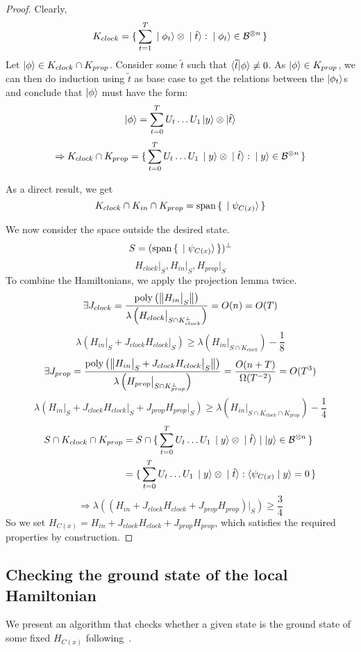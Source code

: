 \begin{proof}
	Clearly,
	$$K_{clock}=\set{\sum_{t=1}^T \ket{\phi_t}\otimes\ket{\hat{t}}:\ket{\phi_t}\in\mathcal{B}^{\otimes n}}$$
	Let $\ket\phi\in K_{clock}\cap K_{prop}$.
	Consider some $\widetilde{t}$ such that $\braket{\widetilde{t}|\phi}\ne0$.
	As $\ket\phi\in K_{prop}$, we can then do induction using $\widetilde{t}$ as base case to get the relations between the $\ket{\phi_t}$s and conclude that $\ket\phi$ must have the form:
	$$\ket\phi=\sum_{t=0}^TU_t\ldots U_1\ket{y}\otimes\ket{\hat{t}}$$
	$$\Rightarrow K_{clock}\cap K_{prop}=\set{\sum_{t=0}^TU_t\ldots U_1\ket{y}\otimes\ket{\hat{t}}: \ket{y}\in\mathcal{B}^{\otimes n}}$$

	As a direct result, we get
	$$K_{clock}\cap K_{in}\cap K_{prop}=\operatorname*{\operatorname{span}}\set{\ket{\psi_{C(x)}}}$$

We now consider the space outside the desired state.
$$S=(\operatorname*{\operatorname{span}}\set{\ket{\psi_{C(x)}}})^\bot$$
$$H_{clock}\big|_S,H_{in}\big|_S,H_{prop}\big|_S$$
To combine the Hamiltonians, we apply the projection lemma twice.
$$\exists J_{clock}
=\frac{\operatorname*{\operatorname{poly}}\left(\left\lVert H_{in}\big|_S\right\rVert\right)}{\lambda\left(H_{clock}\big|_{S\cap K^\bot_{clock}}\right)}
=O(n)=O(T)$$
$$\lambda(H_{in}\big|_S+J_{clock}H_{clock}\big|_S)\geq
\lambda(H_{in}\big|_{S\cap K_{clock}})-\frac{1}{8}$$
$$\exists J_{prop}=\frac{\operatorname*{\operatorname{poly}}\left(\left\lVert H_{in}\big|_S+J_{clock}H_{clock}\big|_S\right\rVert\right)}{\lambda\left(H_{prop}\big|_{S\cap K^\bot_{prop}}\right)}
=\frac{O(n+T)}{\Omega(T^{-2})}=O(T^3)$$
$$\lambda(H_{in}\big|_S+J_{clock}H_{clock}\big|_S+J_{prop}H_{prop}\big|_S)\geq
\lambda(H_{in}\big|_{S\cap K_{clock}\cap K_{prop}})-\frac{1}{4}$$
\begin{align*}
	S\cap K_{clock}\cap K_{prop}&=S\cap\set{\sum_{t=0}^TU_t\ldots U_1\ket{y}\otimes\ket{\hat{t}}|\ket{y}\in\mathcal{B}^{\otimes n}}\\
	&=\set{\sum_{t=0}^TU_t\ldots U_1\ket{y}\otimes\ket{\hat{t}}:\braket{\psi_{C(x)}|y}=0}
\end{align*}
$$\Rightarrow\lambda((H_{in}+J_{clock}H_{clock}+J_{prop}H_{prop})\big|_S)\geq\frac{3}{4}$$
So we set $H_{C(x)}=H_{in}+J_{clock}H_{clock}+J_{prop}H_{prop}$, which satisfies the required properties by construction.
\end{proof}

\subsection{Checking the ground state of the local Hamiltonian}

We present an algorithm that checks whether a given state is the ground state of some fixed $H_{C(x)}$ following~\cite{PhysRevA.93.022326}.

